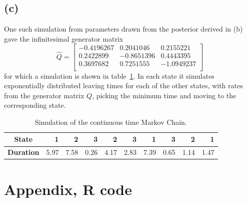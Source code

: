\documentclass{article}
\begin{document}
\subsection{(c)}
One such simulation from parameters drawn from the posterior derived in (b)
gave the infinitesimal generator matrix
$$ \hat Q = \begin{bmatrix}
-0.4196267 & 0.2041046 & 0.2155221 \\
0.2422899 & -0.8651396 & 0.4443395 \\
0.3697682 & 0.7251555 & -1.0949237 \\
\end{bmatrix} $$
for which a simulation is shown in table~\ref{tab:2c_sim}.
In each state it simulates exponentially distributed leaving times
for each of the other states,
with rates from the generator matrix $Q$,
picking the minimum time and moving to the corresponding state.

\begin{table}
	\caption{Simulation of the continuous time Markov Chain. \label{tab:2c_sim}}
	\begin{tabular}{crrrrrrrrr}\toprule
		\textbf{State} & 1 & 2 & 3 & 2 & 3 & 1 & 3 & 2 & 1 \\ \midrule
		\textbf{Duration} & 5.97 & 7.58 & 0.26 & 4.17 & 2.83 & 7.39 & 0.65 & 1.14 & 1.47 \\ \bottomrule
	\end{tabular}
\end{table}

\appendix
\section{Appendix, R code}

\end{document}
